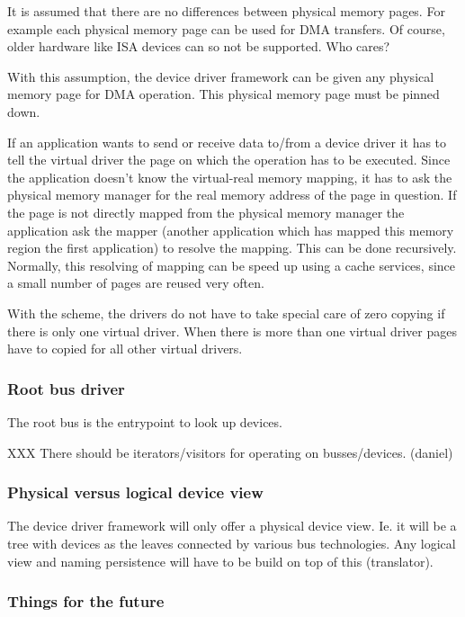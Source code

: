 \documentclass[9pt,a4paper]{extarticle}
\begin{document}
  It is assumed that there are no differences between physical memory
  pages. For example each physical memory page can be used for DMA
  transfers. Of course, older hardware like ISA devices can so not be
  supported. Who cares?
  
  With this assumption, the device driver framework can be given any
  physical memory page for DMA operation.  This physical memory page
  must be pinned down.
  
  If an application wants to send or receive data to/from a device
  driver it has to tell the virtual driver the page on which the
  operation has to be executed.  Since the application doesn't know
  the virtual-real memory mapping, it has to ask the physical memory
  manager for the real memory address of the page in question.  If the
  page is not directly mapped from the physical memory manager the
  application ask the mapper (another application which has mapped
  this memory region the first application) to resolve the mapping.
  This can be done recursively.  Normally, this resolving of mapping
  can be speed up using a cache services, since a small number of
  pages are reused very often.
  
  With the scheme, the drivers do not have to take special care of
  zero copying if there is only one virtual driver.  When there is
  more than one virtual driver pages have to copied for all other
  virtual drivers.

\subsubsection{Root bus driver}
  
  The root bus is the entrypoint to look up devices.
  
  XXX There should be iterators/visitors for operating on
  busses/devices.  (daniel)

\subsubsection{Physical versus logical device view}
  
  The device driver framework will only offer a physical device view.
  Ie. it will be a tree with devices as the leaves connected by
  various bus technologies.  Any logical view and naming persistence
  will have to be build on top of this (translator).

\subsubsection{Things for the future}
\end{document}
